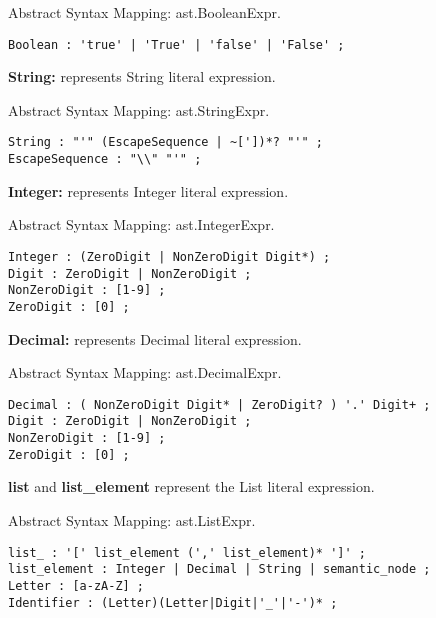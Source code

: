 \documentclass[parskip=full]{uvamscse}
\begin{document}
\begin{description}
Abstract Syntax Mapping: ast.BooleanExpr.

\begin{snippet}
\begin{verbatim}
Boolean : 'true' | 'True' | 'false' | 'False' ;
\end{verbatim}
\end{snippet}

\item\textbf{String:} represents String literal expression.

Abstract Syntax Mapping: ast.StringExpr.

\begin{snippet}
\begin{verbatim}
String : "'" (EscapeSequence | ~['])*? "'" ;
EscapeSequence : "\\" "'" ;
\end{verbatim}
\end{snippet}

\item\textbf{Integer:} represents Integer literal expression. 

Abstract Syntax Mapping: ast.IntegerExpr.

\begin{snippet}
\begin{verbatim}
Integer : (ZeroDigit | NonZeroDigit Digit*) ;
Digit : ZeroDigit | NonZeroDigit ;
NonZeroDigit : [1-9] ;
ZeroDigit : [0] ;
\end{verbatim}
\end{snippet}

\item\textbf{Decimal:} represents Decimal literal expression. 

Abstract Syntax Mapping: ast.DecimalExpr.

\begin{snippet}
\begin{verbatim}
Decimal : ( NonZeroDigit Digit* | ZeroDigit? ) '.' Digit+ ;
Digit : ZeroDigit | NonZeroDigit ;
NonZeroDigit : [1-9] ;
ZeroDigit : [0] ;
\end{verbatim}
\end{snippet}

\item\textbf{list} and \textbf{list\_element} represent the List literal expression. 

Abstract Syntax Mapping: ast.ListExpr.

\begin{snippet}
\begin{verbatim}
list_ : '[' list_element (',' list_element)* ']' ;
list_element : Integer | Decimal | String | semantic_node ;
Letter : [a-zA-Z] ;
Identifier : (Letter)(Letter|Digit|'_'|'-')* ;
\end{verbatim}
\end{snippet}


\end{description}
\end{document}
